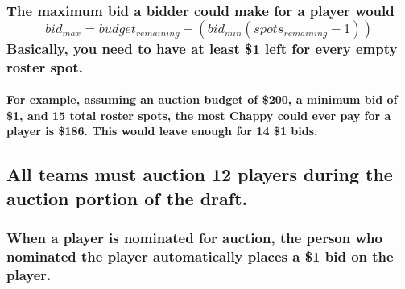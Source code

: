 \documentclass[
]{book}
\begin{document}
\hypertarget{the-maximum-bid-a-bidder-could-make-for-a-player-would-bid_max-budget_remaining---bid_minspots_remaining---1basically-you-need-to-have-at-least-1-left-for-every-empty-roster-spot.}{%
\subsubsection{\texorpdfstring{The maximum bid a bidder could make for a player would \[bid_{max} = budget_{remaining} - (bid_{min}(spots_{remaining} - 1))\]Basically, you need to have at least \$1 left for every empty roster spot.}{The maximum bid a bidder could make for a player would bid\_\{max\} = budget\_\{remaining\} - (bid\_\{min\}(spots\_\{remaining\} - 1))Basically, you need to have at least \$1 left for every empty roster spot.}}\label{the-maximum-bid-a-bidder-could-make-for-a-player-would-bid_max-budget_remaining---bid_minspots_remaining---1basically-you-need-to-have-at-least-1-left-for-every-empty-roster-spot.}}

\hypertarget{for-example-assuming-an-auction-budget-of-200-a-minimum-bid-of-1-and-15-total-roster-spots-the-most-chappy-could-ever-pay-for-a-player-is-186.-this-would-leave-enough-for-14-1-bids.}{%
\paragraph{For example, assuming an auction budget of \$200, a minimum bid of \$1, and 15 total roster spots, the most Chappy could ever pay for a player is \$186. This would leave enough for 14 \$1 bids.}\label{for-example-assuming-an-auction-budget-of-200-a-minimum-bid-of-1-and-15-total-roster-spots-the-most-chappy-could-ever-pay-for-a-player-is-186.-this-would-leave-enough-for-14-1-bids.}}

\hypertarget{all-teams-must-auction-12-players-during-the-auction-portion-of-the-draft.}{%
\subsection{All teams must auction 12 players during the auction portion of the draft.}\label{all-teams-must-auction-12-players-during-the-auction-portion-of-the-draft.}}

\hypertarget{when-a-player-is-nominated-for-auction-the-person-who-nominated-the-player-automatically-places-a-1-bid-on-the-player.}{%
\subsubsection{When a player is nominated for auction, the person who nominated the player automatically places a \$1 bid on the player.}\label{when-a-player-is-nominated-for-auction-the-person-who-nominated-the-player-automatically-places-a-1-bid-on-the-player.}}
\end{document}
